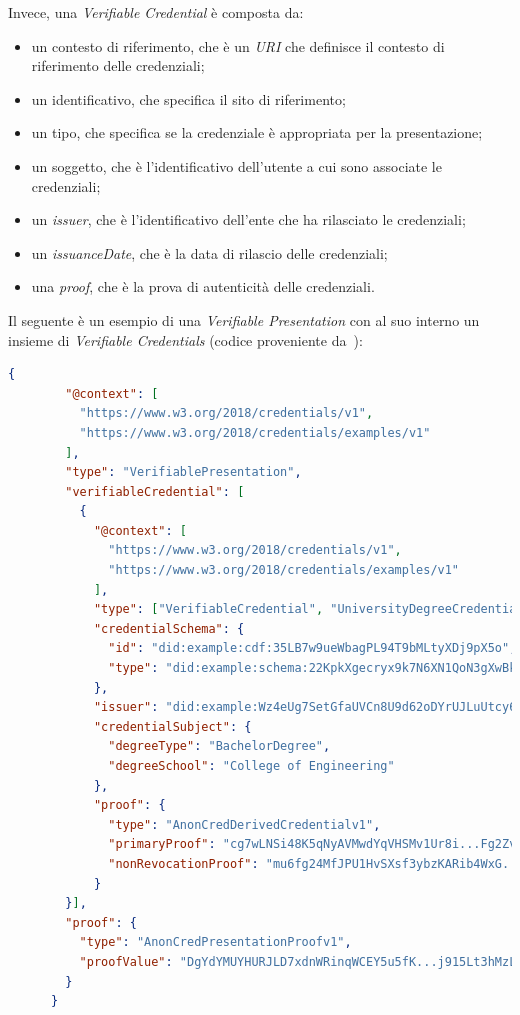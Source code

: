 Invece, una \textit{Verifiable Credential} è composta da:
\begin{itemize}
    \item un contesto di riferimento, che è un \textit{URI} che definisce il contesto di riferimento delle credenziali;
    \item un identificativo, che specifica il sito di riferimento;
    \item un tipo, che specifica se la credenziale è appropriata per la presentazione;
    \item un soggetto, che è l'identificativo dell'utente a cui sono associate le credenziali;
    \item un \textit{issuer}, che è l'identificativo dell'ente che ha rilasciato le credenziali;
    \item un \textit{issuanceDate}, che è la data di rilascio delle credenziali;
    \item una \textit{proof}, che è la prova di autenticità delle credenziali.
\end{itemize}

Il seguente è un esempio di una \textit{Verifiable Presentation} con al suo interno un insieme di \textit{Verifiable Credentials} (codice proveniente da~\cite{site:vpw3c}):
\begin{lstlisting}[language=json]
    {
        "@context": [
          "https://www.w3.org/2018/credentials/v1",
          "https://www.w3.org/2018/credentials/examples/v1"
        ],
        "type": "VerifiablePresentation",
        "verifiableCredential": [
          {
            "@context": [
              "https://www.w3.org/2018/credentials/v1",
              "https://www.w3.org/2018/credentials/examples/v1"
            ],
            "type": ["VerifiableCredential", "UniversityDegreeCredential"],
            "credentialSchema": {
              "id": "did:example:cdf:35LB7w9ueWbagPL94T9bMLtyXDj9pX5o",
              "type": "did:example:schema:22KpkXgecryx9k7N6XN1QoN3gXwBkSU8SfyyYQG"
            },
            "issuer": "did:example:Wz4eUg7SetGfaUVCn8U9d62oDYrUJLuUtcy619",
            "credentialSubject": {
              "degreeType": "BachelorDegree",
              "degreeSchool": "College of Engineering"
            },
            "proof": {
              "type": "AnonCredDerivedCredentialv1",
              "primaryProof": "cg7wLNSi48K5qNyAVMwdYqVHSMv1Ur8i...Fg2ZvWF6zGvcSAsym2sgSk737",
              "nonRevocationProof": "mu6fg24MfJPU1HvSXsf3ybzKARib4WxG...RSce53M6UwQCxYshCuS3d2h"
            }
        }],
        "proof": {
          "type": "AnonCredPresentationProofv1",
          "proofValue": "DgYdYMUYHURJLD7xdnWRinqWCEY5u5fK...j915Lt3hMzLHoPiPQ9sSVfRrs1D"
        }
      }
\end{lstlisting}

